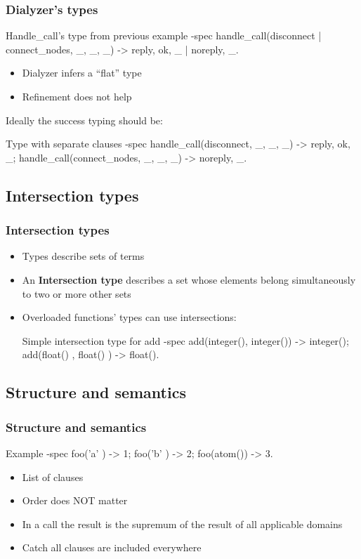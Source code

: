 \documentclass{beamer}
\begin{document}
\begin{frame}[fragile]
  \frametitle{Dialyzer's types}
\begin{code}{Handle\_call's type from previous example}
  -spec handle_call({disconnect | connect_nodes, _},
                    _, _) ->
    {reply, ok, _} | {noreply, _}.
\end{code}
  \begin{itemize}
    \item Dialyzer infers a ``flat'' type \pause      
    \item Refinement does not help
  \end{itemize}
  \pause Ideally the success typing should be:
\begin{code}{Type with separate clauses}
  -spec handle_call({disconnect, _}, _, _)
                       -> {reply, ok, _};
        handle_call({connect_nodes, _}, _, _)
                       -> {noreply, _}.
\end{code}
\end{frame}

\subsection{Intersection types}

\begin{frame}[fragile]
  \frametitle{Intersection types}
  \begin{itemize}
  \item Types describe sets of terms
  \item An \textbf{Intersection type} describes a set whose elements
    belong simultaneously to two or more other sets
  \item Overloaded functions' types can use intersections:
    \begin{code}{Simple intersection type for add}
-spec add(integer(), integer()) -> integer();
      add(float()  , float()  ) -> float().
    \end{code}
  \end{itemize}
\end{frame}

\subsection{Structure and semantics}

\begin{frame}[fragile]
  \frametitle{Structure and semantics}
  \begin{code}{Example}
-spec foo('a'   ) -> 1;
      foo('b'   ) -> 2;
      foo(atom()) -> 3.
  \end{code}
  \begin{itemize}
  \item List of clauses
  \item Order does NOT matter
  \item In a call the result is the supremum of the result of all
    applicable domains
  \item Catch all clauses are included everywhere
  \end{itemize}
\end{frame}
\end{document}
